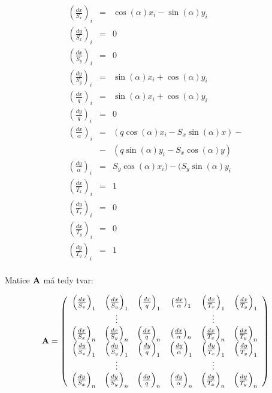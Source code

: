 $$ 
\begin{array}{lll}
 \left(\frac{dx}{S_x}\right)_i &=& \cos{(\alpha)}x_i - \sin{(\alpha)}y_i\\
 \left(\frac{dy}{S_x}\right)_i &=& 0 \\
 \left(\frac{dx}{S_y}\right)_i &=& 0 \\
 \left(\frac{dy}{S_y}\right)_i &=&\sin{(\alpha)}x_i + \cos{(\alpha)}y_i\\
 \left(\frac{dx}{q}\right)_i &=&\sin{(\alpha)}x_i + \cos{(\alpha)}y_i\\
 \left(\frac{dy}{q}\right)_i &=& 0 \\
 \left(\frac{dx}{\alpha}\right)_i &=& (q \cos{(\alpha)}x_i - S_{x} 
 \sin{(\alpha)} x) - \\ 
                                & -&(q \sin{(\alpha)} y_i - S_{x}
                                \cos{(\alpha)} y)
                                 \\                
 \left(\frac{dy}{\alpha} \right)_i &=& S_{y} \cos{(\alpha)}x_i) - (S_{y}
 \sin{(\alpha)} y_i \\ 
 \left(\frac{dx}{T_x}\right)_i &=& 1 \\
 \left(\frac{dy}{T_x}\right)_i &=& 0 \\
 \left(\frac{dx}{T_y}\right)_i &=& 0 \\
 \left(\frac{dy}{T_y}\right)_i &=& 1 \\
\end{array}
$$

Matice ${\bf A}$ má tedy tvar:

$$ {\bf A}= \left(
\begin{array}{cccccc}
 \left(\frac{dx}{S_x}\right)_1  &  \left(\frac{dx}{S_y}\right)_1 &
 \left(\frac{dx}{q}\right)_1    & \left(\frac{dx}{\alpha}\right)_1 &  
 \left(\frac{dx}{T_x}\right)_1  &  \left(\frac{dx}{T_y}\right)_1 \\
 &\vdots& & &\vdots& \\ 
  \left(\frac{dx}{S_x}\right)_n &  \left(\frac{dx}{S_y}\right)_n &
 \left(\frac{dx}{q}\right)_n    & \left(\frac{dx}{\alpha}\right)_n &  
 \left(\frac{dx}{T_x}\right)_n  &  \left(\frac{dx}{T_y}\right)_n \\ 
   \left(\frac{dy}{S_x}\right)_1 &  \left(\frac{dy}{S_y}\right)_1 &
 \left(\frac{dy}{q}\right)_1    & \left(\frac{dy}{\alpha}\right)_1 &  
 \left(\frac{dy}{T_x}\right)_1  &  \left(\frac{dy}{T_y}\right)_1 \\
  &\vdots& & &\vdots& \\
  \left(\frac{dy}{S_x}\right)_n &  \left(\frac{dy}{S_y}\right)_n &
 \left(\frac{dy}{q}\right)_n    & \left(\frac{dy}{\alpha}\right)_n &  
 \left(\frac{dy}{T_x}\right)_n  &  \left(\frac{dy}{T_y}\right)_n 
\end{array}
\right) $$

